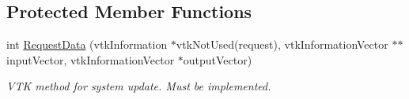 \subsection*{Protected Member Functions}
\begin{DoxyCompactItemize}
\item 
\hypertarget{classvtkParticleSpringSystem_aedebbd3d9c7dc881a6b4e4c9c2e925ab}{
int \hyperlink{classvtkParticleSpringSystem_aedebbd3d9c7dc881a6b4e4c9c2e925ab}{RequestData} (vtkInformation $\ast$vtkNotUsed(request), vtkInformationVector $\ast$$\ast$inputVector, vtkInformationVector $\ast$outputVector)}
\label{classvtkParticleSpringSystem_aedebbd3d9c7dc881a6b4e4c9c2e925ab}

\begin{DoxyCompactList}\small\item\em VTK method for system update. Must be implemented. \item\end{DoxyCompactList}\end{DoxyCompactItemize}
